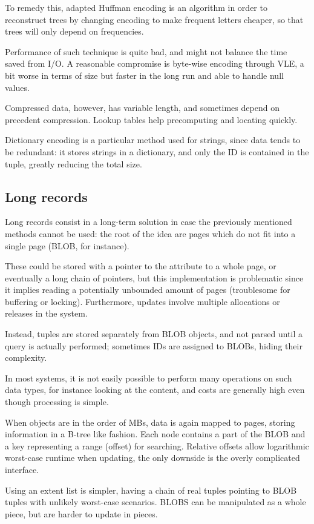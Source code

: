 To remedy this, adapted Huffman encoding is an algorithm in order to reconstruct trees by changing encoding to make frequent letters cheaper, so that trees will only depend on frequencies.

Performance of such technique is quite bad, and might not balance the time saved from I/O. A reasonable compromise is byte-wise encoding through VLE, a bit worse in terms of size but faster in the long run and able to handle null values.

Compressed data, however, has variable length, and sometimes depend on precedent compression. Lookup tables help precomputing and locating quickly.

Dictionary encoding is a particular method used for strings, since data tends to be redundant: it stores strings in a dictionary, and only the ID is contained in the tuple, greatly reducing the total size. 

\subsection{Long records}
Long records consist in a long-term solution in case the previously mentioned methods cannot be used: the root of the idea are pages which do not fit into a single page (BLOB, for instance).

These could be stored with a pointer to the attribute to a whole page, or eventually a long chain of pointers, but this implementation is problematic since it implies reading a potentially unbounded amount of pages (troublesome for buffering or locking). Furthermore, updates involve multiple allocations or releases in the system. 

Instead, tuples are stored separately from BLOB objects, and not parsed until a query is actually performed; sometimes IDs are assigned to BLOBs, hiding their complexity.

In most systems, it is not easily possible to perform many operations on such data types, for instance looking at the content, and costs are generally high even though processing is simple.

When objects are in the order of MBs, data is again mapped to pages, storing information in a B-tree like fashion. Each node contains a part of the BLOB and a key representing a range (offset) for searching. Relative offsets allow logarithmic worst-case runtime when updating, the only downside is the overly complicated interface.

Using an extent list is simpler, having a chain of real tuples pointing to BLOB tuples with unlikely worst-case scenarios. BLOBS can be manipulated as a whole piece, but are harder to update in pieces. 

